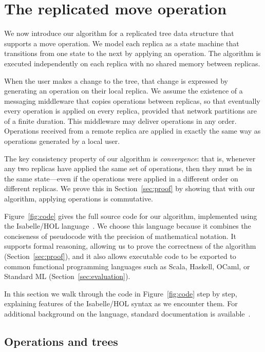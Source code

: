 \documentclass[sigconf]{acmart}
\begin{document}
\section{The replicated move operation}\label{sec:algorithm}

We now introduce our algorithm for a replicated tree data structure that supports a move operation.
We model each replica as a state machine that transitions from one state to the next by applying an operation.
The algorithm is executed independently on each replica with no shared memory between replicas.

When the user makes a change to the tree, that change is expressed by generating an operation on their local replica.
We assume the existence of a messaging middleware that copies operations between replicas, so that eventually every operation is applied on every replica, provided that network partitions are of a finite duration.
This middleware may deliver operations in any order.
Operations received from a remote replica are applied in exactly the same way as operations generated by a local user.

The key consistency property of our algorithm is \emph{convergence}: that is, whenever any two replicas have applied the same set of operations, then they must be in the same state---even if the operations were applied in a different order on different replicas.
We prove this in Section~\ref{sec:proof} by showing that with our algorithm, applying operations is commutative.

Figure~\ref{fig:code} gives the full source code for our algorithm, implemented using the Isabelle/HOL language~\cite{DBLP:conf/tphol/WenzelPN08}.
We choose this language because it combines the conciseness of pseudocode with the precision of mathematical notation.
It supports formal reasoning, allowing us to prove the correctness of the algorithm (Section~\ref{sec:proof}), and it also allows executable code to be exported to common functional programming languages such as Scala, Haskell, OCaml, or Standard ML (Section~\ref{sec:evaluation}).

In this section we walk through the code in Figure~\ref{fig:code} step by step, explaining features of the Isabelle/HOL syntax as we encounter them.
For additional background on the language, standard documentation is available~\cite{DBLP:books/sp/NipkowK14}.

\subsection{Operations and trees}\label{sec:ops-trees}
\end{document}
